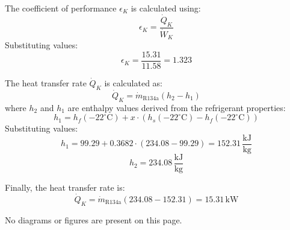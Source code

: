 The coefficient of performance \( \epsilon_K \) is calculated using:  
\[
\epsilon_K = \frac{\dot{Q}_K}{\dot{W}_K}
\]  
Substituting values:  
\[
\epsilon_K = \frac{15.31}{11.58} = 1.323
\]  

The heat transfer rate \( \dot{Q}_K \) is calculated as:  
\[
\dot{Q}_K = \dot{m}_{\text{R134a}} (h_2 - h_1)
\]  
where \( h_2 \) and \( h_1 \) are enthalpy values derived from the refrigerant properties:  
\[
h_1 = h_f(-22^\circ \text{C}) + x \cdot (h_s(-22^\circ \text{C}) - h_f(-22^\circ \text{C}))
\]  
Substituting values:  
\[
h_1 = 99.29 + 0.3682 \cdot (234.08 - 99.29) = 152.31 \, \frac{\text{kJ}}{\text{kg}}
\]  
\[
h_2 = 234.08 \, \frac{\text{kJ}}{\text{kg}}
\]  

Finally, the heat transfer rate is:  
\[
\dot{Q}_K = \dot{m}_{\text{R134a}} (234.08 - 152.31) = 15.31 \, \text{kW}
\]  

No diagrams or figures are present on this page.